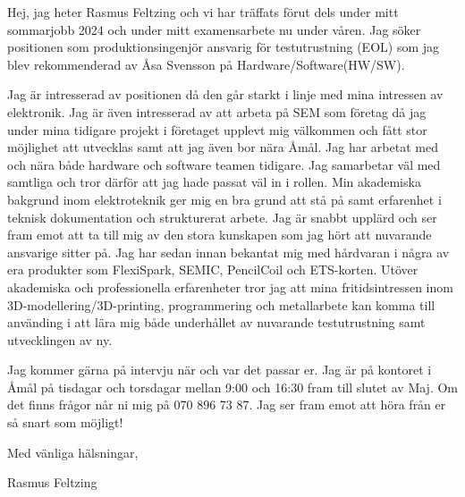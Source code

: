 \documentclass{article}
\begin{document}
Hej, jag heter Rasmus Feltzing och vi har träffats förut dels under mitt sommarjobb 2024 och under mitt examensarbete nu under våren. Jag söker positionen som produktionsingenjör ansvarig för testutrustning (EOL) som jag blev rekommenderad av Åsa Svensson på Hardware/Software(HW/SW). 


Jag är intresserad av positionen då den går starkt i linje med mina intressen av elektronik. Jag är även intresserad av att arbeta på SEM som företag då jag under mina tidigare projekt i företaget upplevt mig välkommen och fått stor möjlighet att utvecklas samt att jag även bor nära Åmål. Jag har arbetat med och nära både hardware och software teamen tidigare. Jag samarbetar väl med samtliga och tror därför att jag hade passat väl in i rollen. Min akademiska bakgrund inom elektroteknik ger mig en bra grund att stå på samt erfarenhet i teknisk dokumentation och strukturerat arbete. Jag är snabbt upplärd och ser fram emot att ta till mig av den stora kunskapen som jag hört att nuvarande ansvarige sitter på. Jag har sedan innan bekantat mig med hårdvaran i några av era produkter som FlexiSpark, SEMIC, PencilCoil och ETS-korten. Utöver akademiska och professionella erfarenheter tror jag att mina fritidsintressen inom 3D-modellering/3D-printing, programmering och metallarbete kan komma till använding i att lära mig både underhållet av nuvarande testutrustning samt utvecklingen av ny. 


Jag kommer gärna på intervju när och var det passar er. Jag är på kontoret i Åmål på tisdagar och torsdagar mellan 9:00 och 16:30 fram till slutet av Maj. Om det finns frågor når ni mig på 070 896 73 87. Jag ser fram emot att höra från er så snart som möjligt! 

\bigskip %

Med vänliga hälsningar,

\vspace{50pt} %

Rasmus Feltzing
\end{document}
